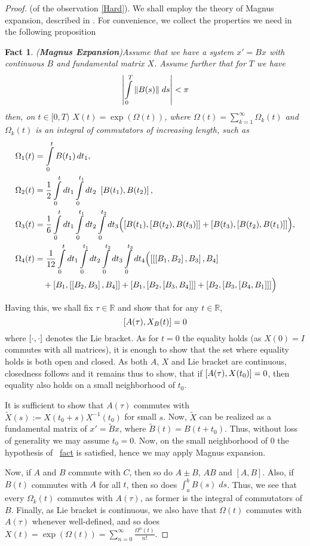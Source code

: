 \documentclass[12pt]{article} %
\newtheorem*{fact}{Fact}
\theoremstyle{remark}
\begin{document}
\begin{proof}{(of the observation \ref{Hard}).\;}
We shall employ the theory of Magnus expansion, described in \cite{moan}. For convenience, we collect
the properties we need in the following proposition
\begin{fact}{(\textbf{Magnus Expansion})}Assume that we have a system $x'=Bx$ with continuous $B$ and fundamental matrix $X$. Assume
	further that for $T$ we have
	\[\myabs{\int_0^T\mynorm{B(s)}\;ds}<\pi\]
	then, on $t\in[0,T)$ $X(t)=\exp(\Omega(t))$, where $\Omega(t)=\sum\limits_{k=1}^\infty\Omega_k(t)$ and $\Omega_k(t)$ is an integral
	of commutators of increasing length, such as
	\begin{align*}
	\Omega_1(t) &= \int_0^t B(t_1)\,dt_1, \\
	\Omega_2(t) &= \frac{1}{2}\int_0^t dt_1 \int_0^{t_1} dt_2\ \left[  B(t_1),B(t_2)\right], \\
	\Omega_3(t) &= \frac{1}{6} \int_0^t dt_1 \int_0^{t_1}d t_2 \int_0^{t_2} dt_3
	\Bigl(\left[B(t_1),\left[B(t_2),B(t_3)\right]\right]+\left[B(t_3),\left[  B(t_2),B(t_{1})\right]\right]\Bigr), \\
	\Omega_4(t) &= \frac{1}{12} \int_0^t dt_1 \int_0^{t_1}d t_2 \int_0^{t_2} dt_3 \int_0^{t_3} dt_4
	\Bigl(\left[\left[\left[B_1,B_2\right],B_3\right],B_4\right] \\
	&\quad+\left[B_1,\left[\left[B_2,B_3\right],B_4\right]\right]
	+\left[B_1,\left[B_2,\left[B_3,B_4\right]\right]\right]
	+\left[B_2,\left[B_3,\left[B_4,B_1\right]\right]\right]\Bigr)
	\end{align*}
\end{fact}
Having this, we shall fix $\tau\in\mathbb{R}$ and show that for any $t\in\mathbb{R}$,
\[\left[A(\tau),X_B(t)\right]=0\]
where $\left[\cdot,\cdot\right]$ denotes the Lie bracket. As for $t=0$ the equality holds (as $X(0)=I$ commutes with all matrices), it is enough
to show that the set where equality holds is both open and closed. As both $A$, $X$ and Lie bracket are continuous, closedness follows and it
remains thus to show, that if $\left[A(\tau),X(t_0)\right]=0$, then equality also holds on a small neighborhood of $t_0$.

It is sufficient to show that $A(\tau)$ commutes with $\tilde{X}(s):=X(t_0+s)X^{-1}(t_0)$ for small $s$. Now, $\tilde{X}$ can be realized
as a fundamental matrix of $x'=\tilde{B}x$, where $\tilde{B}(t)=B(t+t_0)$. Thus, without loss of generality we may assume $t_0=0$. Now, on the small
neighborhood of $0$ the hypothesis of ~\hyperref[MagnusConvergenceFact]{fact} is satisfied, hence we may apply Magnus expansion.

Now, if $A$ and $B$ commute with $C$, then so do $A\pm B$, $AB$ and $[A,B]$. Also, if $B(t)$ commutes with $A$ for all $t$, then so does
$\int_a^bB(s)\;ds$. Thus, we see that every $\Omega_k(t)$ commutes with $A(\tau)$, as former is the integral of commutators of $B$. Finally,
as Lie bracket is continuous, we also have that $\Omega(t)$ commutes with $A(\tau)$ whenever well-defined, and so does $X(t)=\exp(\Omega(t))=
\sum_{n=0}^\infty\frac{\Omega^n(t)}{n!}$.
\end{proof}
\end{document}
